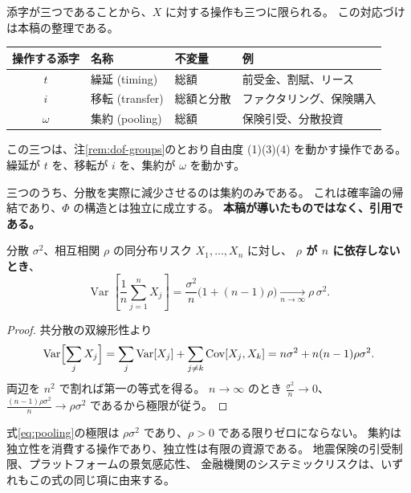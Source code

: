 添字が三つであることから、$X$ に対する操作も三つに限られる。
この対応づけは本稿の整理である。

\begin{center}
\begin{tabular}{@{}clll@{}}
\toprule
操作する添字 & 名称 & 不変量 & 例 \\
\midrule
$t$ & 繰延 (timing) & 総額 & 前受金、割賦、リース \\
$i$ & 移転 (transfer) & 総額と分散 & ファクタリング、保険購入 \\
$\omega$ & 集約 (pooling) & 総額 & 保険引受、分散投資 \\
\bottomrule
\end{tabular}
\label{tab:three-ops}
\end{center}

この三つは、注\ref{rem:dof-groups}のとおり自由度 (1)(3)(4) を動かす操作である。
繰延が $t$ を、移転が $i$ を、集約が $\omega$ を動かす。

三つのうち、分散を実際に減少させるのは集約のみである。
これは確率論の帰結であり、$\Phi$ の構造とは独立に成立する。
\textbf{本稿が導いたものではなく、引用である。}

\begin{proposition}[集約による分散低減]
\label{prop:pooling}
分散 $\sigma^2$、相互相関 $\rho$ の同分布リスク $X_1,\dots,X_n$ に対し、
\textbf{$\rho$ が $n$ に依存しないとき}、
\begin{equation}
\operatorname{Var}\!\left[\frac{1}{n}\sum_{j=1}^{n} X_j\right]
= \frac{\sigma^2}{n}\bigl(1+(n-1)\rho\bigr)
\xrightarrow[n\to\infty]{} \rho\,\sigma^2 .
\label{eq:pooling}
\end{equation}
\end{proposition}

\begin{proof}
共分散の双線形性より
\[
\operatorname{Var}\Bigl[\sum_j X_j\Bigr]
= \sum_j \operatorname{Var}[X_j] + \sum_{j\neq k}\operatorname{Cov}[X_j,X_k]
= n\sigma^2 + n(n-1)\rho\sigma^2 .
\]
両辺を $n^2$ で割れば第一の等式を得る。
$n\to\infty$ のとき $\frac{\sigma^2}{n}\to 0$、
$\frac{(n-1)\rho\sigma^2}{n}\to\rho\sigma^2$ であるから極限が従う。
\end{proof}

\begin{remark}[独立性は有限の資源である]
\label{rem:independence-finite}
式\eqref{eq:pooling}の極限は $\rho\sigma^2$ であり、$\rho>0$ である限りゼロにならない。
集約は独立性を消費する操作であり、独立性は有限の資源である。
地震保険の引受制限、プラットフォームの景気感応性、
金融機関のシステミックリスクは、いずれもこの式の同じ項に由来する。
\end{remark}

